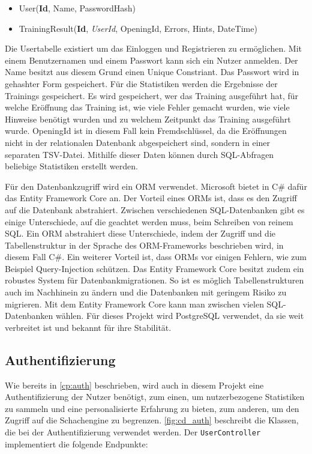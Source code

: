\begin{itemize}
  \item User(\textbf{Id}, Name, PasswordHash)
  \item TrainingResult(\textbf{Id}, \textit{UserId}, OpeningId, Errors, Hints, DateTime)
\end{itemize}

Die Usertabelle existiert um das Einloggen und Registrieren zu ermöglichen. Mit einem Benutzernamen und einem Passwort kann sich ein Nutzer anmelden. Der Name besitzt aus diesem Grund einen Unique Constriant. Das Passwort wird in gehashter Form gespeichert. Für die Statistiken werden die Ergebnisse der Trainings gespeichert. Es wird gespeichert, wer das Training ausgeführt hat, für welche Eröffnung das Training ist, wie viele Fehler gemacht wurden, wie viele Hinweise benötigt wurden und zu welchem Zeitpunkt das Training ausgeführt wurde. OpeningId ist in diesem Fall kein Fremdschlüssel, da die Eröffnungen nicht in der relationalen Datenbank abgespeichert sind, sondern in einer separaten TSV-Datei. Mithilfe dieser Daten können durch SQL-Abfragen beliebige Statistiken erstellt werden.

Für den Datenbankzugriff wird ein \ac{ORM} verwendet. Microsoft bietet in C\# dafür das Entity Framework Core an. Der Vorteil eines \ac{ORM}s ist, dass es den Zugriff auf die Datenbank abstrahiert. Zwischen verschiedenen SQL-Datenbanken gibt es einige Unterschiede, auf die geachtet werden muss, beim Schreiben von reinem SQL. Ein \ac{ORM} abstrahiert diese Unterschiede, indem der Zugriff und die Tabellenstruktur in der Sprache des ORM-Frameworks beschrieben wird, in diesem Fall C\#. Ein weiterer Vorteil ist, dass \ac{ORM}s vor einigen Fehlern, wie zum Beispiel Query-Injection schützen. Das Entity Framework Core besitzt zudem ein robustes System für Datenbankmigrationen. So ist es möglich Tabellenstrukturen auch im Nachhinein zu ändern und die Datenbanken mit geringem Risiko zu migrieren. Mit dem Entity Framework Core kann man zwischen vielen SQL-Datenbanken wählen. Für dieses Projekt wird PostgreSQL verwendet, da sie weit verbreitet ist und bekannt für ihre Stabilität.

\subsection{Authentifizierung}
Wie bereits in \autoref{cp:auth} beschrieben, wird auch in diesem Projekt eine Authentifizierung der Nutzer benötigt, zum einen, um nutzerbezogene Statistiken zu sammeln und eine personalisierte Erfahrung zu bieten, zum anderen, um den Zugriff auf die Schachengine zu begrenzen. \autoref{fig:cd_auth} beschreibt die Klassen, die bei der Authentifizierung verwendet werden. Der \lstinline{UserController} implementiert die folgende Endpunkte:

